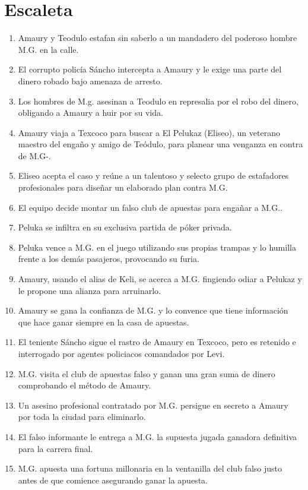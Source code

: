 \documentclass[12pt,letterpaper]{article}
\begin{document}
\section{ Escaleta}
\begin{enumerate}
    \item Amaury y Teodulo estafan sin saberlo a un mandadero del poderoso hombre M.G. en la calle.
    \item El corrupto policía Sáncho  intercepta a Amaury y le exige una parte del dinero robado bajo amenaza de arresto.
    \item Los hombres de M.g. asesinan a Teodulo en represalia por el robo del dinero, obligando a Amaury  a huir por su vida.
    \item Amaury  viaja a Texcoco para buscar a El Pelukaz (Eliseo), un veterano maestro del engaño y amigo de Teódulo, para planear una venganza en contra de M.G-.
    \item Eliseo acepta el caso y reúne a un talentoso y selecto grupo de estafadores profesionales para diseñar un elaborado plan contra M.G.
    \item El equipo decide montar un falso club de apuestas para engañar a M.G..
    \item Peluka se infiltra en su exclusiva partida de póker privada.
    \item Peluka vence a M.G. en el juego utilizando sus propias trampas y lo humilla frente a los demás pasajeros, provocando su furia.
    \item Amaury, usando el alias de Keli, se acerca a M.G. fingiendo odiar a Pelukaz  y le propone una alianza para arruinarlo.
    \item Amaury se gana la confianza de M.G. y lo convence que tiene información que hace ganar siempre en la casa de apuestas.
    \item El teniente Sáncho sigue el rastro de Amaury  en Texcoco, pero es retenido e interrogado por agentes policiacos comandados por Levi.
    \item M.G.  visita el club de apuestas falso y ganan una gran suma de dinero comprobando el método de Amaury. 
    \item Un asesino profesional contratado por M.G. persigue en secreto a Amaury por toda la ciudad para eliminarlo.
    \item El falso informante  le entrega a M.G. la supuesta jugada ganadora definitiva para la carrera final.
    \item M.G. apuesta una fortuna millonaria en la ventanilla del club falso justo antes de que comience asegurando ganar la apuesta. 

\end{enumerate}
\end{document}

